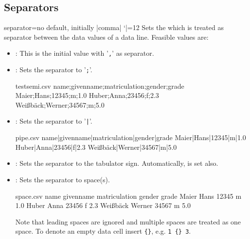 \documentclass[a4paper,11pt]{ltxdoc}
\begin{document}
\subsection{Separators}\label{sec:separators}%
\begin{docCsvKey}{separator}{=}{no default, initially |comma|}
  \catcode `|=12
  Sets the  which is treated as separator between the data values
  of a data line. Feasible values are:
  \begin{itemize}
  \item{}: This is the initial value with '\texttt{,}' as separator.
  \medskip

  \item{}: Sets the separator to '\texttt{;}'.
\begin{dispExample}
\begin{tcbverbatimwrite}{testsemi.csv}
  name;givenname;matriculation;gender;grade
  Maier;Hans;12345;m;1.0
  Huber;Anna;23456;f;2.3
  Weißbäck;Werner;34567;m;5.0
\end{tcbverbatimwrite}

\end{dispExample}
\medskip

\item{}: Sets the separator to '\texttt{|}'.
\begin{dispExample}
\begin{tcbverbatimwrite}{pipe.csv}
  name|givenname|matriculation|gender|grade
  Maier|Hans|12345|m|1.0
  Huber|Anna|23456|f|2.3
  Weißbäck|Werner|34567|m|5.0
\end{tcbverbatimwrite}

\end{dispExample}
\medskip

\item{}: Sets the separator to the tabulator sign.
  Automatically,  is set also.

\clearpage
\item{}:
  Sets the separator to space(s).
\begin{dispExample}
\begin{tcbverbatimwrite}{space.csv}
  name     givenname matriculation gender grade
  Maier    Hans      12345         m      1.0
  Huber    Anna      23456         f      2.3
  Weißbäck Werner    34567         m      5.0
\end{tcbverbatimwrite}

\end{dispExample}
  Note that leading spaces are ignored and multiple spaces are treated as one space.
  To denote an empty data cell insert \verb+{}+, e.g. \verb*+1 {} 3+.
  \end{itemize}
\end{docCsvKey}
\end{document}
